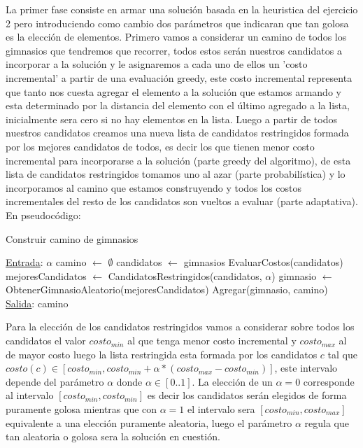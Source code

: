 La primer fase consiste en armar una solución basada en la heuristica del ejercicio 2 pero introduciendo como cambio dos parámetros que indicaran que tan golosa es la elección de elementos. Primero vamos a considerar un camino de todos los gimnasios que tendremos que recorrer, todos estos serán nuestros candidatos a incorporar a la solución y le asignaremos a cada uno de ellos un 'costo incremental' a partir de una evaluación greedy, este costo incremental representa que tanto nos cuesta agregar el elemento a la solución que estamos armando y esta determinado por la distancia del elemento con el último agregado a la lista, inicialmente sera cero si no hay elementos en la lista. Luego a partir de todos nuestros candidatos creamos una nueva lista de candidatos restringidos formada por los mejores candidatos de todos, es decir los que tienen menor costo incremental para incorporarse a la solución (parte greedy del algoritmo), de esta lista de candidatos restringidos tomamos uno al azar (parte probabilística) y lo incorporamos al camino que estamos construyendo y todos los costos incrementales del resto de los candidatos son vueltos a evaluar (parte adaptativa). En pseudocódigo:

\begin{algorithm}[H]

\label{}
\caption{Construir camino de gimnasios}

\begin{algorithmic}[1]

\Statex \underline{Entrada}: $\alpha$
\medskip
\State camino $\gets$ $\emptyset$
\State candidatos $\gets$ gimnasios
    \State EvaluarCostos(candidatos)
	\State mejoresCandidatos $\gets$ CandidatosRestringidos(candidatos, $\alpha$)
	\State gimnasio $\gets$ ObtenerGimnasioAleatorio(mejoresCandidatos)
	\State Agregar(gimnasio, camino)
\EndWhile
\medskip
\Statex \underline{Salida}: camino

\end{algorithmic}
\end{algorithm}

Para la elección de los candidatos restringidos vamos a considerar sobre todos los candidatos el valor $costo_{min}$ al que tenga menor costo incremental y $costo_{max}$ al de mayor costo luego la lista restringida esta formada por los candidatos $c$ tal que $costo(c) \in [costo_{min}, costo_{min} + \alpha * (costo_{max} - costo_{min})]$, este intervalo depende del parámetro $\alpha$ donde $\alpha \in [0..1]$. La elección de un $\alpha = 0$ corresponde al intervalo $[costo_{min}, costo_{min}]$ es decir los candidatos serán elegidos de forma puramente golosa mientras que con $\alpha = 1$ el intervalo sera $[costo_{min}, costo_{max}]$ equivalente a una elección puramente aleatoria, luego el parámetro $\alpha$ regula que tan aleatoria o golosa sera la solución en cuestión.

